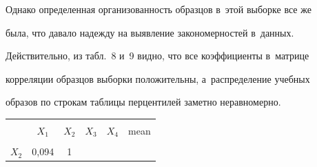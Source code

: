 \begin{description}
\begin{figure}
\begin{center}
{ }


\end{center}


 \vspace*{-9pt}




\end{figure}


  


  Однако определенная организованность образцов в~этой выборке все же 


была, что давало надежду на выявление закономерностей в~данных. 


Действительно, из табл.~8 и~9 видно, что все коэффициенты в~матрице 


корреляции образцов выборки положительны, а~распределение учебных 


образов по строкам таблицы перцентилей заметно неравномерно. 


  





  \begin{table}\small %


\begin{center}


\parbox{272pt}{





}





\vspace*{2ex}





\tabcolsep=10.8pt


\begin{tabular}{|c|c|c|c|c|c|}


\hline


&&&&&\\[-9pt]


&$X_1$&$X_2$&$X_3$&$X_4$&mean\\


\hline


&&&&&\\[-9pt]


$X_2$&0,094&1&&&\\



\end{tabular}
\end{center}
\end{table}
\end{description}
